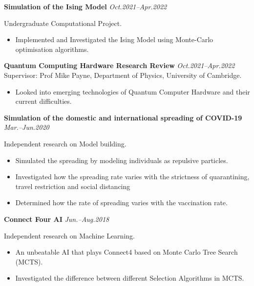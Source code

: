 \documentclass[11pt,a4paper,roman]{moderncv}        %
\begin{document}
\textbf{Simulation of the Ising Model} \hfill \textit{Oct.2021--Apr.2022} 
\vspace*{1mm}\\ 
{
Undergraduate Computational Project.
\vspace*{1mm}
\begin{itemize}
	\item Implemented and Investigated the Ising Model using Monte-Carlo optimisation algorithms.\\
\end{itemize}
}

\textbf{Quantum Computing Hardware Research Review} \hfill \textit{Oct.2021--Apr.2022}
\vspace*{1mm}\\
{Supervisor: Prof Mike Payne, Department of Physics, University of Cambridge.}
\vspace*{1mm}
\begin{itemize}
    \item Looked into emerging technologies of Quantum Computer Hardware and their current difficulties.\\
\end{itemize}

\textbf{Simulation of the domestic and international spreading of COVID-19} \hfill \textit{Mar.--Jun.2020} 
\vspace*{1mm}\\
{
Independent research on Model building.
\vspace*{1mm}
\begin{itemize}
	\item Simulated the spreading by modeling individuals as repulsive particles.
    \item Investigated how the spreading rate varies with the strictness of quarantining, travel restriction and  social distancing
    \item Determined how the rate of spreading varies with the vaccination rate.\\
\end{itemize}
}

\textbf{Connect Four AI} \hfill \textit{Jun.--Aug.2018} 
\vspace*{1mm}\\
{
Independent research on Machine Learning.
\vspace*{1mm}
\begin{itemize}
	\item An unbeatable AI that plays Connect4 based on Monte Carlo Tree Search (MCTS).
	\item Investigated the difference between different Selection Algorithms in MCTS.
\end{itemize}
}
\end{document}
